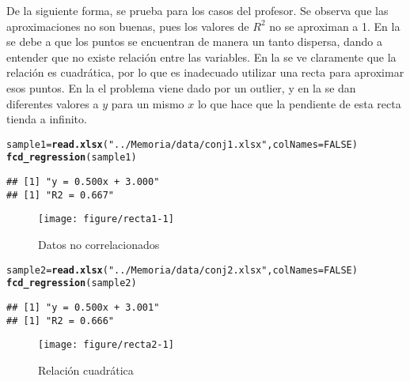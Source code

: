 \documentclass[12pt]{report}\usepackage[]{graphicx}\usepackage[dvipsnames]{xcolor}
\makeatletter
\def\maxwidth{ %
  \ifdim\Gin@nat@width>\linewidth
    \linewidth
  \else
    \Gin@nat@width
  \fi
}
\newcommand{\hlnum}[1]{\textcolor[rgb]{0.686,0.059,0.569}{#1}}%
\newcommand{\hlstr}[1]{\textcolor[rgb]{0.192,0.494,0.8}{#1}}%
\newcommand{\hlstd}[1]{\textcolor[rgb]{0.345,0.345,0.345}{#1}}%
\newcommand{\hlkwb}[1]{\textcolor[rgb]{0.69,0.353,0.396}{#1}}%
\newcommand{\hlkwc}[1]{\textcolor[rgb]{0.333,0.667,0.333}{#1}}%
\newcommand{\hlkwd}[1]{\textcolor[rgb]{0.737,0.353,0.396}{\textbf{#1}}}%
\newenvironment{kframe}{%
 \def\at@end@of@kframe{}%
 \ifinner\ifhmode%
  \def\at@end@of@kframe{\end{minipage}}%
  \begin{minipage}{\columnwidth}%
 \fi\fi%
 \def\FrameCommand##1{\hskip\@totalleftmargin \hskip-\fboxsep
 \colorbox{shadecolor}{##1}\hskip-\fboxsep
     \hskip-\linewidth \hskip-\@totalleftmargin \hskip\columnwidth}%
 \MakeFramed {\advance\hsize-\width
   \@totalleftmargin\z@ \linewidth\hsize
   \@setminipage}}%
 {\par\unskip\endMakeFramed%
 \at@end@of@kframe}
\newenvironment{knitrout}{}{} %
\makeatother
\begin{document}
 				De la siguiente forma, se prueba para los casos del profesor. Se observa que las aproximaciones no son buenas, pues los valores de $R^2$ no se aproximan a 1. En la  se debe a que los puntos se encuentran de manera un tanto dispersa, dando a entender que no existe relación entre las variables. En la  se ve claramente que la relación es cuadrática, por lo que es inadecuado utilizar una recta para aproximar esos puntos. En la  el problema viene dado por un outlier, y en la  se dan diferentes valores a $y$ para un mismo $x$ lo que hace que la pendiente de esta recta tienda a infinito. %
 				
\begin{knitrout}
\color{fgcolor}\begin{kframe}
\begin{alltt}
\hlstd{sample1} \hlkwb{=} \hlkwd{read.xlsx}\hlstd{(}\hlstr{"../Memoria/data/conj1.xlsx"}\hlstd{,} \hlkwc{colNames}\hlstd{=}\hlnum{FALSE}\hlstd{)}
\hlkwd{fcd_regression}\hlstd{(sample1)}
\end{alltt}
\begin{verbatim}
## [1] "y = 0.500x + 3.000"
## [1] "R2 = 0.667"
\end{verbatim}
\end{kframe}\begin{figure}[H]

{\centering \texttt{[image: figure/recta1-1]} 

}

\caption[Datos no correlacionados]{Datos no correlacionados}\label{fig:recta1}
\end{figure}

\end{knitrout}
 				
\begin{knitrout}
\color{fgcolor}\begin{kframe}
\begin{alltt}
\hlstd{sample2} \hlkwb{=} \hlkwd{read.xlsx}\hlstd{(}\hlstr{"../Memoria/data/conj2.xlsx"}\hlstd{,} \hlkwc{colNames}\hlstd{=}\hlnum{FALSE}\hlstd{)}
\hlkwd{fcd_regression}\hlstd{(sample2)}
\end{alltt}
\begin{verbatim}
## [1] "y = 0.500x + 3.001"
## [1] "R2 = 0.666"
\end{verbatim}
\end{kframe}\begin{figure}[H]

{\centering \texttt{[image: figure/recta2-1]} 

}

\caption[Relación cuadrática]{Relación cuadrática}\label{fig:recta2}
\end{figure}

\end{knitrout}
 				
\end{document}
